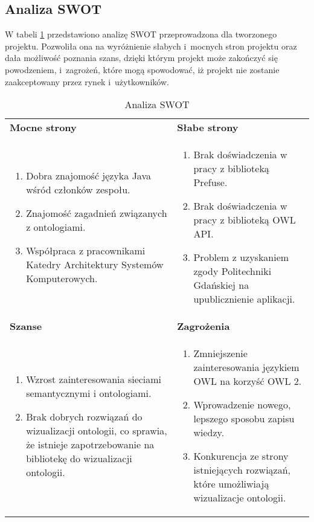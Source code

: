 \subsection{Analiza SWOT}

W tabeli \ref{t:swot} przedstawiono analizę SWOT przeprowadzona dla tworzonego projektu. Pozwoliła  ona na wyróżnienie słabych  i~mocnych stron projektu 
oraz dała możliwość poznania szans, dzięki którym projekt może zakończyć się powodzeniem, i~zagrożeń, które mogą spowodować, iż projekt nie zostanie zaakceptowany 
przez rynek i~użytkowników. 


\begin{longtable}{|m{7cm}|m{7cm}|} 
\caption{Analiza SWOT}
\label{t:swot} \\
\hline
\bf{Mocne strony} 	&  \bf{Słabe strony}  \\ 
\begin{enumerate}
\item Dobra znajomość języka Java wśród członków zespołu.
 \item Znajomość zagadnień związanych z ontologiami.
 \item Współpraca z pracownikami Katedry Architektury Systemów Komputerowych.
\end{enumerate}
 & 
\begin{enumerate}
 \item Brak doświadczenia w pracy z biblioteką Prefuse.
 \item Brak doświadczenia w pracy z biblioteką OWL API.
 \item Problem z uzyskaniem zgody Politechniki Gdańskiej na upublicznienie aplikacji.
\end{enumerate}
\\ \hline
\bf{Szanse} 	&  \bf{Zagrożenia}  \\ 
\begin{enumerate}
 \item Wzrost zainteresowania sieciami semantycznymi i ontologiami.
 \item Brak dobrych rozwiązań do wizualizacji ontologii, co sprawia, że istnieje zapotrzebowanie na bibliotekę do wizualizacji ontologii.
\end{enumerate}
 & 
\begin{enumerate}
 \item Zmniejszenie zainteresowania językiem OWL na korzyść OWL 2.
 \item Wprowadzenie nowego, lepszego sposobu zapisu wiedzy.
 \item Konkurencja ze strony istniejących rozwiązań, które umożliwiają wizualizacje ontologii. 
\end{enumerate}
\\ \hline
\end{longtable}


